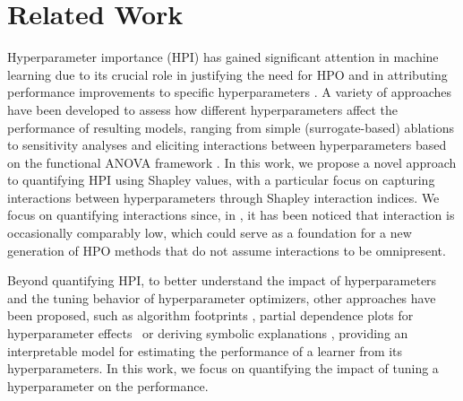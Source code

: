 \section{Related Work}
\label{sec:related-work}

Hyperparameter importance (HPI) has gained significant attention in machine learning due to its crucial role in justifying the need for HPO and in attributing performance improvements to specific hyperparameters \citep{tunability,DBLP:conf/gecco/PushakH20a,DBLP:journals/telo/PushakH22,DBLP:conf/ppsn/SchneiderSPBTK22}.
A variety of approaches have been developed to assess how different hyperparameters affect the performance of resulting models, ranging from simple (surrogate-based) ablations \citep{Fawcett-jh16a,DBLP:conf/aaai/BiedenkappLEHFH17} to sensitivity analyses and eliciting interactions between hyperparameters based on the functional ANOVA framework \citep{fANOVA,DBLP:conf/kdd/RijnH18,elShawiTuneOrNotTune,DBLP:conf/ijcai/WatanabeBH23}. 
In this work, we propose a novel approach to quantifying HPI using Shapley values, with a particular focus on capturing interactions between hyperparameters through Shapley interaction indices. We focus on quantifying interactions since, in \citep{zimmer-tpami21a,DBLP:journals/telo/PushakH22,DBLP:journals/jscic/NovelloPLC23}, it has been noticed that interaction is occasionally comparably low, which could serve as a foundation for a new generation of HPO methods that do not assume interactions to be omnipresent.

Beyond quantifying HPI, to better understand the impact of hyperparameters and the tuning behavior of hyperparameter optimizers, other approaches have been proposed, such as algorithm footprints \citep{DBLP:conf/cec/Smith-MilesT12}, partial dependence plots for hyperparameter effects~\cite{DBLP:conf/nips/MoosbauerHCLB21} or deriving symbolic explanations \citep{DBLP:conf/automl/SegelGTBL23}, providing an interpretable model for estimating the performance of a learner from its hyperparameters. In this work, we focus on quantifying the impact of tuning a hyperparameter on the performance.



